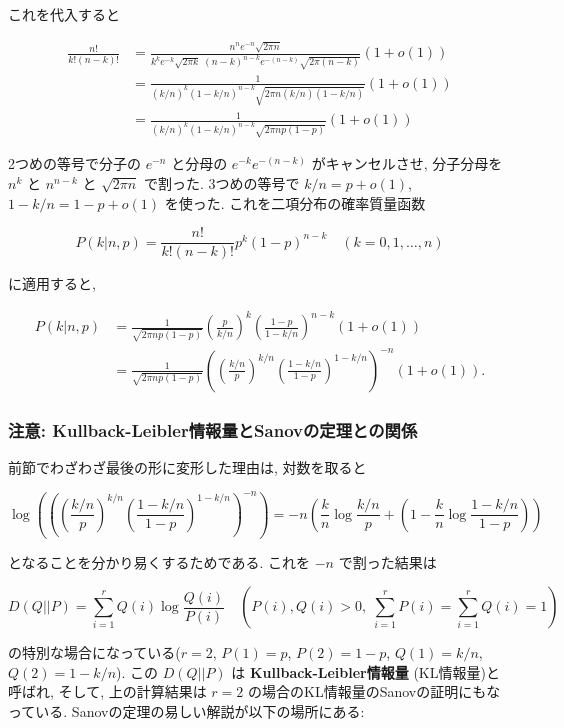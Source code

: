 \documentclass[
  letterpaper,
  DIV=11,
  numbers=noendperiod]{scrartcl}
\begin{document}
これを代入すると

\[
\begin{aligned}
\frac{n!}{k!(n-k)!} &=
\frac{n^n e^{-n} \sqrt{2\pi n}}{k^k e^{-k} \sqrt{2\pi k}\;(n-k)^{n-k} e^{-(n-k)} \sqrt{2\pi (n-k)}}
(1 + o(1))
\\ &=
\frac{1}{(k/n)^k(1-k/n)^{n-k}\sqrt{2\pi n(k/n)(1-k/n)}}(1 + o(1))
\\ &=
\frac{1}{(k/n)^k(1-k/n)^{n-k}\sqrt{2\pi np(1-p)}}(1 + o(1))
\end{aligned}
\]

2つめの等号で分子の \(e^{-n}\) と分母の \(e^{-k}e^{-(n-k)}\)
がキャンセルさせ, 分子分母を \(n^k\) と \(n^{n-k}\) と \(\sqrt{2\pi n}\)
で割った. 3つめの等号で \(k/n = p + o(1)\), \(1-k/n = 1-p + o(1)\)
を使った. これを二項分布の確率質量函数

\[
P(k|n,p) = \frac{n!}{k!(n-k)!} p^k(1-p)^{n-k} \quad (k=0,1,\ldots,n)
\]

に適用すると,

\[
\begin{aligned}
P(k|n,p) &=
\frac{1}{\sqrt{2\pi np(1-p)}}
\left(\frac{p}{k/n}\right)^k\left(\frac{1-p}{1-k/n}\right)^{n-k}
(1 + o(1))
\\ &=
\frac{1}{\sqrt{2\pi np(1-p)}}
\left(\left(\frac{k/n}{p}\right)^{k/n}\left(\frac{1-k/n}{1-p}\right)^{1-k/n}\right)^{-n}
(1 + o(1)).
\end{aligned}
\]

\hypertarget{ux6ce8ux610f-kullback-leiblerux60c5ux5831ux91cfux3068sanovux306eux5b9aux7406ux3068ux306eux95a2ux4fc2}{%
\subsubsection{注意:
Kullback-Leibler情報量とSanovの定理との関係}\label{ux6ce8ux610f-kullback-leiblerux60c5ux5831ux91cfux3068sanovux306eux5b9aux7406ux3068ux306eux95a2ux4fc2}}

前節でわざわざ最後の形に変形した理由は, 対数を取ると

\[
\log\left(
\left(\left(\frac{k/n}{p}\right)^{k/n}\left(\frac{1-k/n}{1-p}\right)^{1-k/n}\right)^{-n}
\right) = -n\left(\frac{k}{n}\log\frac{k/n}{p} + \left(1-\frac{k}{n}\log\frac{1-k/n}{1-p}\right)\right)
\]

となることを分かり易くするためである. これを \(-n\) で割った結果は

\[
D(Q||P) = \sum_{i=1}^r Q(i) \log\frac{Q(i)}{P(i)}\quad
\left(P(i), Q(i) > 0,\; \sum_{i=1}^r P(i) = \sum_{i=1}^r Q(i) = 1\right)
\]

の特別な場合になっている(\(r=2\), \(P(1)=p\), \(P(2)=1-p\),
\(Q(1)=k/n\), \(Q(2)=1-k/n\)). この \(D(Q||P)\) は
\textbf{Kullback-Leibler情報量} (KL情報量)と呼ばれ, そして,
上の計算結果は \(r=2\) の場合のKL情報量のSanovの証明にもなっている.
Sanovの定理の易しい解説が以下の場所にある:
\end{document}
